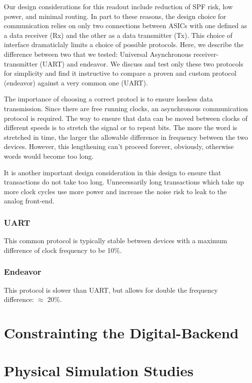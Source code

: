 Our design considerations for this readout include reduction of SPF risk, low power, and minimal routing.
In part to these reasons, the design choice for communication relies on only two connections between ASICs with one defined as a data receiver (Rx) and the other as a data transmitter (Tx).
This choice of interface dramaticlaly limits a choice of possible protocols.
Here, we describe the difference between two that we tested: Universal Asynchronous receiver-transmitter (UART) and endeavor.
We discuss and test only these two protocols for simplicity and find it instructive to compare a proven and custom protocol (endeavor) against a very common one (UART).

The importance of choosing a correct protocl is to ensure lossless data transmission.
Since there are free running clocks, an asynchronous communication protocol is required.
The way to ensure that data can be moved between clocks of different speeds is to stretch the signal or to repeat bits.
The more the word is stretched in time, the larger the allowable difference in frequency between the two devices.
However, this lengthening can't proceed forever, obviously, otherwise words would become too long.

It is another important design consideration in this design to ensure that transactions do not take too long.
Unnecessarily long transactions which take up more clock cycles use more power and increase the noise risk to leak to the analog front-end.


\subsubsection{UART}
This common protocol is typically stable between devices with a maximum difference of clock frequency to be 10\%.

\subsubsection{Endeavor}
This protocol is slower than UART, but allows for double the frequency difference: $\approx$ 20\%.

\section{Constrainting the Digital-Backend}

\section{Physical Simulation Studies}

